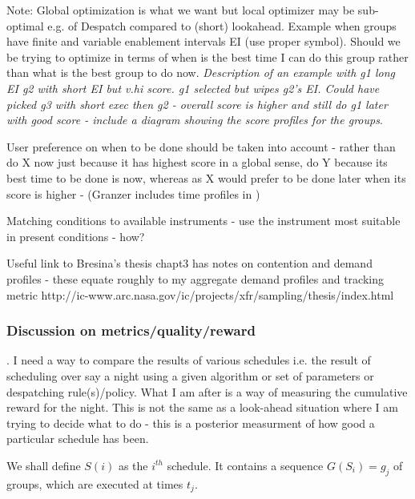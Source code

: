 Note: Global optimization is what we want but local optimizer may be sub-optimal e.g. of Despatch compared to (short) lookahead. Example when groups have finite and variable enablement intervals EI (use proper symbol). Should we be trying to optimize in terms of when is the best time I can do this group rather than what is the best group to do now. \emph{Description of an example with g1 long EI g2 with short EI but v.hi score. g1 selected but wipes g2's EI. Could have picked g3 with short exec then g2 - overall score is higher and still do g1 later with good score - include a diagram showing the score profiles for the groups}.




\begin{note}User preference on when to be done should be taken into account - rather than do X now just because it has highest score in a global sense, do Y because its best time to be done is now, whereas as X would prefer to be done later when its score is higher - (Granzer includes time profiles in \cite{granzer03stella})
\end{note}

\begin{note}Matching conditions to available instruments - use the instrument most suitable in present conditions - how?\end{note}

\begin{note}Useful link to Bresina's thesis chapt3 has notes on contention and demand profiles - these equate roughly to my aggregate demand profiles and tracking metric http://ic-www.arc.nasa.gov/ic/projects/xfr/sampling/thesis/index.html\end{note}


\subsubsection{Discussion on metrics/quality/reward}.
I need a way to compare the results of various schedules i.e. the result of scheduling over say a night using a given algorithm or set of parameters or despatching rule(s)/policy. What I am after is a way of measuring the cumulative reward for the night. This is not the same as a look-ahead situation where I am trying to decide what to do - this is a posterior measurment of how good a particular schedule has been.

We shall define $S(i)$ as the $i^{th}$ schedule. It contains a sequence $G(S_i) = {g_j}$ of groups, which are executed at times ${t_j}$.

